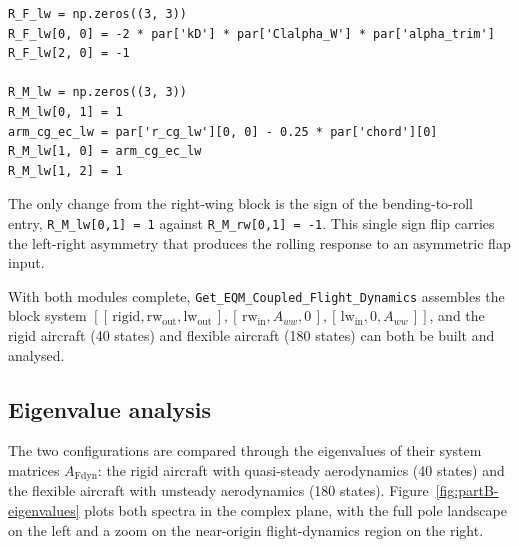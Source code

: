 \begin{verbatim}
R_F_lw = np.zeros((3, 3))
R_F_lw[0, 0] = -2 * par['kD'] * par['Clalpha_W'] * par['alpha_trim']
R_F_lw[2, 0] = -1

R_M_lw = np.zeros((3, 3))
R_M_lw[0, 1] = 1
arm_cg_ec_lw = par['r_cg_lw'][0, 0] - 0.25 * par['chord'][0]
R_M_lw[1, 0] = arm_cg_ec_lw
R_M_lw[1, 2] = 1
\end{verbatim}

The only change from the right-wing block is the sign of the bending-to-roll entry, \texttt{R\_M\_lw[0,1] = 1} against \texttt{R\_M\_rw[0,1] = -1}. This single sign flip carries the left-right asymmetry that produces the rolling response to an asymmetric flap input.

With both modules complete, \texttt{Get\_EQM\_Coupled\_Flight\_Dynamics} assembles the block system $[[\,\text{rigid}, \text{rw}_{\text{out}}, \text{lw}_{\text{out}}\,], [\,\text{rw}_{\text{in}}, A_{ww}, 0\,], [\,\text{lw}_{\text{in}}, 0, A_{ww}\,]]$, and the rigid aircraft (40 states) and flexible aircraft (180 states) can both be built and analysed.

\subsection{Eigenvalue analysis}
\label{sec:partB-eigenvalues}

The two configurations are compared through the eigenvalues of their system matrices $A_{\text{Fdyn}}$: the rigid aircraft with quasi-steady aerodynamics (40 states) and the flexible aircraft with unsteady aerodynamics (180 states). Figure~\ref{fig:partB-eigenvalues} plots both spectra in the complex plane, with the full pole landscape on the left and a zoom on the near-origin flight-dynamics region on the right.

